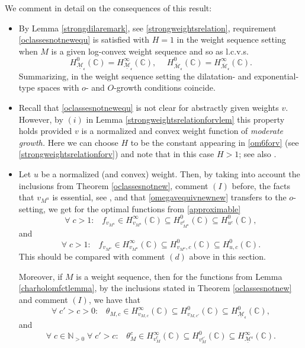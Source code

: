 \documentclass[10pt]{amsart}%
\numberwithin{equation}{section}
\theoremstyle{plain}
\newcommand{\CC}{\mathbb{C}}
\newcommand{\NN}{\mathbb{N}}
\begin{document}
We comment in detail on the consequences of this result:

\begin{itemize}
	\item[$(I)$] By Lemma \ref{strongdilaremark}, see \eqref{strongweightsrelation}, requirement \eqref{oclassesnotnewequ} is satisfied with $H=1$ in the weight sequence setting when $M$ is a given log-convex weight sequence and so as l.c.v.s. $$H^{0}_{\underline{\mathcal{M}}_{\mathfrak{c}}}(\CC)=H^{\infty}_{\underline{\mathcal{M}}_{\mathfrak{c}}}(\CC),\hspace{15pt}H^{0}_{\overline{\mathcal{M}}_{\mathfrak{c}}}(\CC)=H^{\infty}_{\overline{\mathcal{M}}_{\mathfrak{c}}}(\CC).$$
	Summarizing, in the weight sequence setting the dilatation- and exponential-type spaces with $o$- and $O$-growth conditions coincide.
	
	\item[$(II)$] Recall that \eqref{oclassesnotnewequ} is not clear for abstractly given weights $v$. However, by $(i)$ in Lemma \ref{strongweightsrelationforvlem} this property holds provided $v$ is a normalized and convex weight function of \emph{moderate growth.} Here we can choose $H$ to be the constant appearing in \eqref{om6forv} (see \eqref{strongweightsrelationforv}) and note that in this case $H>1$; see also \cite[Sect. 2.8]{weightedentirecharacterization}.

\item[$(III)$] Let $u$ be a normalized (and convex) weight. Then, by taking into account the inclusions from Theorem \ref{oclassesnotnew}, comment $(I)$ before, the facts that $v_{M^u}$ is essential, see \cite[Thm. 3.4 $(i)$]{weightedentirecharacterization}, and that \eqref{omegavequivnewnew} transfers to the $o$-setting, we get for the optimal functions from \eqref{approximable}
    $$\forall\;c>1:\;\;\;f_{v_{M^u}}\in H^{\infty}_{v_{M^u}}(\CC)\subseteq H^{0}_{v_{M^u}^c}(\CC)\subseteq H^{0}_{u^c}(\CC),$$
    and
    $$\forall\;c>1:\;\;\;f_{v_{M^u}}\in H^{\infty}_{v_{M^u}}(\CC)\subseteq H^{0}_{v_{M^u},c}(\CC)\subseteq H^{0}_{u,c}(\CC).$$
    This should be compared with comment $(d)$ above in this section.

    Moreover, if $M$ is a weight sequence, then for the functions from Lemma \ref{charholomfctlemma}, by the inclusions stated in Theorem \ref{oclassesnotnew} and comment $(I)$, we have that
\begin{equation}\label{strongthetaequ}
\forall\;c'>c>0:\;\;\;\theta_{M,c}\in H^{\infty}_{v_{M,c}}(\CC)\subseteq H^{0}_{v_{M,c'}}(\CC)\subseteq H^{0}_{\underline{\mathcal{M}}_{\mathfrak{c}}}(\CC),
\end{equation}
and
\begin{equation}\label{strongthetaequ1}
\forall\;c\in\NN_{>0}\;\forall\;c'>c:\;\;\;\theta^c_M\in H^{\infty}_{v^c_M}(\CC)\subseteq H^{0}_{v^{c'}_M}(\CC)\subseteq H^{\infty}_{\underline{\mathcal{M}}^{\mathfrak{c}}}(\CC).
\end{equation}
\end{itemize}
\end{document}
